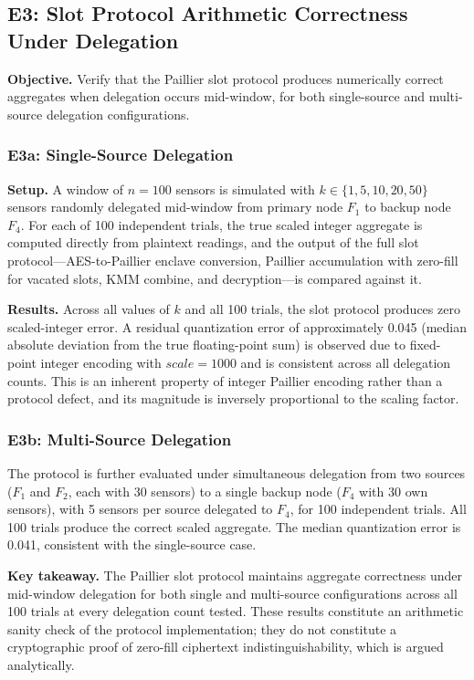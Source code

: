 \documentclass[conference]{IEEEtran}
\begin{document}
    \subsection{E3: Slot Protocol Arithmetic Correctness Under Delegation}
    \label{sec:eval-e3}

    \textbf{Objective.} Verify that the Paillier slot protocol produces numerically correct aggregates when delegation occurs mid-window, for both single-source and multi-source delegation configurations.

    \subsubsection{E3a: Single-Source Delegation}
    \textbf{Setup.} A window of $n=100$ sensors is simulated with $k\in\{1,5,10,20,50\}$ sensors randomly delegated mid-window from primary node $F_1$ to backup node $F_4$. For each of 100 independent trials, the true scaled integer aggregate is computed directly from plaintext readings, and the output of the full slot protocol---AES-to-Paillier enclave conversion, Paillier accumulation with zero-fill for vacated slots, KMM combine, and decryption---is compared against it.

    \textbf{Results.} Across all values of $k$ and all 100 trials, the slot protocol produces zero scaled-integer error. A residual quantization error of approximately 0.045 (median absolute deviation from the true floating-point sum) is observed due to fixed-point integer encoding with $scale=1000$ and is consistent across all delegation counts. This is an inherent property of integer Paillier encoding rather than a protocol defect, and its magnitude is inversely proportional to the scaling factor.

    \subsubsection{E3b: Multi-Source Delegation}
    The protocol is further evaluated under simultaneous delegation from two sources ($F_1$ and $F_2$, each with 30 sensors) to a single backup node ($F_4$ with 30 own sensors), with 5 sensors per source delegated to $F_4$, for 100 independent trials. All 100 trials produce the correct scaled aggregate. The median quantization error is 0.041, consistent with the single-source case.

    \textbf{Key takeaway.} The Paillier slot protocol maintains aggregate correctness under mid-window delegation for both single and multi-source configurations across all 100 trials at every delegation count tested. These results constitute an arithmetic sanity check of the protocol implementation; they do not constitute a cryptographic proof of zero-fill ciphertext indistinguishability, which is argued analytically.
\end{document}
